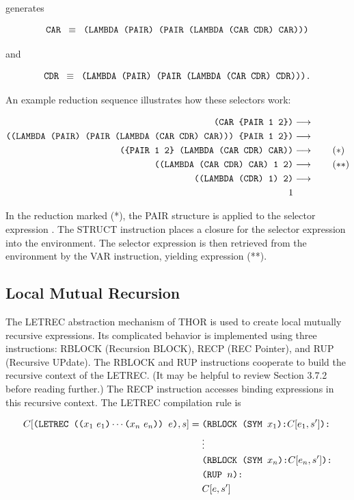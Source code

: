 generates

\[
\texttt{CAR }\equiv\texttt{ (LAMBDA (PAIR) (PAIR (LAMBDA (CAR CDR) CAR)))}
\]

and

\[
\texttt{CDR }\equiv\texttt{ (LAMBDA (PAIR) (PAIR (LAMBDA (CAR CDR) CDR))).}
\]

An example reduction sequence illustrates how these selectors work:

\begin{align*}
\texttt{(CAR \{PAIR 1 2\})} &\longrightarrow\\
\texttt{((LAMBDA (PAIR) (PAIR (LAMBDA (CAR CDR) CAR))) \{PAIR 1 2\})} &\longrightarrow\\
\texttt{(\{PAIR 1 2\} (LAMBDA (CAR CDR) CAR))} &\longrightarrow \qquad (*)\\
\texttt{((LAMBDA (CAR CDR) CAR) 1 2)} &\longrightarrow \qquad (**)\\
\texttt{((LAMBDA (CDR) 1) 2)} &\longrightarrow\\
1
\end{align*}

In the reduction marked (*), the PAIR structure is applied to the selector expression
. The STRUCT instruction places a closure for the selector
expression into the environment. The selector expression is then retrieved from the
environment by the VAR instruction, yielding expression (**).

\subsection{Local Mutual Recursion}

The LETREC abstraction mechanism of THOR is used to create local mutually recursive
expressions. Its complicated behavior is implemented using three instructions: RBLOCK
(Recursion BLOCK), RECP (REC Pointer), and RUP (Recursive UPdate). The RBLOCK and RUP
instructions cooperate to build the recursive context of the LETREC. (It may be helpful to
review Section 3.7.2 before reading further.) The RECP instruction accesses binding
expressions in this recursive context. The LETREC compilation rule is

\[
\begin{aligned}
C[\texttt{(LETREC ((}x_1\ e_1\texttt{)}\cdots\texttt{(}x_n\ e_n\texttt{)) }e\texttt{)}, s] ={}&
  \texttt{(RBLOCK (SYM }x_1\texttt{):}C[e_1,s']\texttt{):}\\
& \vdots\\
& \texttt{(RBLOCK (SYM }x_n\texttt{):}C[e_n,s']\texttt{):}\\
& \texttt{(RUP }n\texttt{):}\\
& C[e,s']
\end{aligned}
\]

